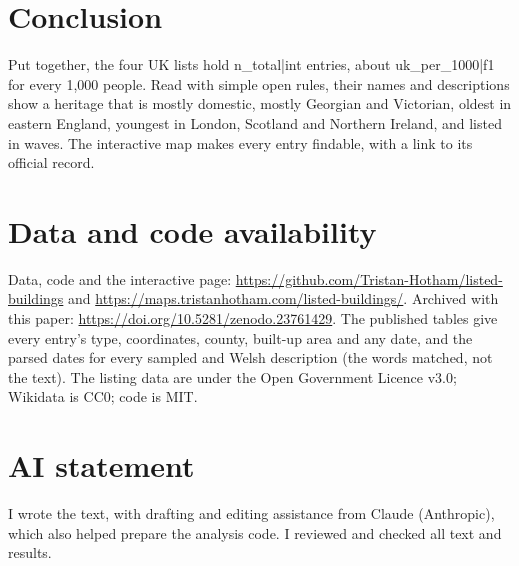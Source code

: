 \documentclass[11pt,a4paper]{article}
\begin{document}
\section{Conclusion}

Put together, the four UK lists hold {{n_total|int}} entries, about {{uk_per_1000|f1}} for every 1,000 people. Read with simple open rules, their names and descriptions show a heritage that is mostly domestic, mostly Georgian and Victorian, oldest in eastern England, youngest in London, Scotland and Northern Ireland, and listed in waves. The interactive map makes every entry findable, with a link to its official record.

\section*{Data and code availability}

Data, code and the interactive page: \url{https://github.com/Tristan-Hotham/listed-buildings} and \url{https://maps.tristanhotham.com/listed-buildings/}. Archived with this paper: \url{https://doi.org/10.5281/zenodo.23761429}. The published tables give every entry's type, coordinates, county, built-up area and any date, and the parsed dates for every sampled and Welsh description (the words matched, not the text). The listing data are under the Open Government Licence v3.0; Wikidata is CC0; code is MIT.

\section*{AI statement}

I wrote the text, with drafting and editing assistance from Claude (Anthropic), which also helped prepare the analysis code. I reviewed and checked all text and results.
\end{document}
